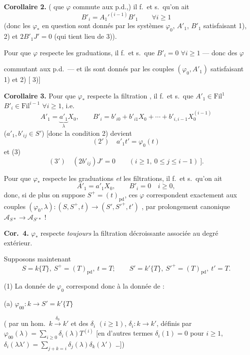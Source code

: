 \documentclass[11pt,a4paper]{article}
\begin{document}
\textbf{Corollaire 2.} ( que $\varphi$ commute aux p.d.,) il f.\ et s.\ qu'on ait
\[
B'_{i}=A_{1}'^{(i-1)}B'_{1}\qquad\forall i\geq 1
\]
(donc les $\varphi_{*}$ en question sont donnés par les systèmes $\varphi_{0}$, $A'_{1}$, $B'_{1}$ satisfaisant 1), 2) et $2B'_{1}J'=0$ (qui tient lieu de 3)).

Pour que $\varphi$ respecte les graduations, il f.\ et s.\ que $B'_{i}=0$ $\forall i\geq 1$ — \struck{(}donc  des $\varphi$

commutant aux p.d.\ — et ils sont donnés par les couples $(\varphi_{0},A'_{1})$ satisfaisant 1) et 2) [\ill{} \ill{} 3)]  

\textbf{Corollaire 3.} Pour que $\varphi_{*}$  respecte la filtration , il f.\ et s.\ que $A'_{1}\in\mathrm{Fil}^{1}$  $B'_{i}\in\mathrm{Fil}^{i-1}$ $\forall i\geq 1$, i.e.
\[
A'_{1}=\underbrace{a'_{1}}_{\lambda}X_{0},\qquad
B'_{i}=b'_{i0}+b'_{i1}X_{0}+\cdots+b'_{i,i-1}X_{0}^{(i-1)}
\]
($a'_{1}, b'_{ij}\in S'$) [donc la condition 2) devient
\[
(2')\quad a'_{1}t'=\varphi_{0}(t)
\]
et (3)
\[
(3')\quad (2b'_{ij})J'=0\qquad (i\geq 1,\ 0\leq j\leq i-1)\ ].
\]

Pour que $\varphi_{*}$  respecte les graduations \emph{et} les filtrations, il f.\ et s.\ qu'on ait
\[
A'_{1}=a'_{1}X_{0},\qquad B'_{i}=0\quad i\geq 0,
\]
donc, si de plus on suppose $S^{+}=(t)_{\mathrm{pd}}$, ces $\varphi$ correspondent exactement aux couples $(\varphi_{0},\lambda)\colon (S,S^{+},t)\to(S',S'^{+},t')$ \struck{\ill{}}, par prolongement canonique $\mathcal{A}_{S*}\to\mathcal{A}_{S'*}$ !

\textbf{Cor.\ 4.} $\varphi_{*}$ respecte \emph{toujours} la filtration décroissante associée au degré extérieur.

Supposons maintenant
\[
S=k\{T\},\ S^{+}=(T)_{\mathrm{pd}},\ t=T;\qquad
S'=k'\{T\},\ S'^{+}=(T)_{\mathrm{pd}},\ t'=T.
\]

(1) La donnée de $\varphi_{0}$ correspond donc à la donnée de :

(a) $\varphi_{00}\colon k\to S'=k'\{T\}$ \struck{\ill{}}

( par un hom.\ $k\xrightarrow{\delta_{0}}k'$ \ill{} et des  $\delta_{i}$ $(i\geq 1)$, $\delta_{i}\colon k\to k'$, définis par $\varphi_{00}(\lambda)=\sum_{i\geq 0}\delta_{i}(\lambda)T^{(i)}$ [en d'autres termes $\delta_{i}(1)=0$ pour $i\geq 1$, $\delta_{i}(\lambda\lambda')=\sum_{j+k=i}\delta_{j}(\lambda)\delta_{k}(\lambda')$ \ldots])
\end{document}
